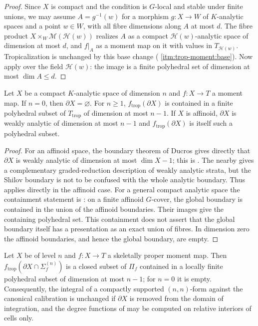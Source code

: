 \begin{proof}
Since $X$ is compact and the condition is $G$-local and stable under finite
unions, we may assume $A=g^{-1}(w)$ for a morphism $g:X\to W$ of
$K$-analytic spaces and a point $w\in W$, with all fibre dimensions along
$A$ at most $d$. The fibre product $X\times_W\mathcal M(\mathcal H(w))$
realizes $A$ as a compact $\mathcal H(w)$-analytic space of dimension at most
$d$, and $f|_A$ as a moment map on it with values in
$T_{\mathcal H(w)}$. Tropicalization is unchanged by this base change
( \cref{itm:trop-moment:base}). Now apply
 over the field
$\mathcal H(w)$: the image is a finite polyhedral set of dimension at most
$\dim A\le d$.
\end{proof}

\begin{proposition}
\label{prop:trop-boundary-thin}
Let $X$ be a compact $K$-analytic space of dimension $n$ and $f:X\to T$ a
moment map. If $n=0$, then $\partial X=\varnothing$. For $n\ge1$,
$f_{\mathrm{trop}}(\partial X)$ is contained in a finite polyhedral
subset of $T_{\mathrm{trop}}$ of dimension at most $n-1$. If $X$ is
affinoid, $\partial X$ is weakly analytic of dimension at most $n-1$ and
$f_{\mathrm{trop}}(\partial X)$ is itself such a polyhedral subset.
\end{proposition}

\begin{proof}
For an affinoid space, the boundary theorem of Ducros gives directly that
$\partial X$ is weakly analytic of dimension at most $\dim X-1$; this is
\cite[Example~11.10.2]{CLD25}. The nearby
\cite[Proposition~11.10.4]{CLD25} gives a complementary graded-reduction
description of weakly analytic strata, but the Shilov boundary is not to be
confused with the whole analytic boundary. Thus
 applies directly in the affinoid case.
For a general compact analytic space the containment statement is
\cite[Corollary~12.2.6]{CLD25}: on a finite affinoid $G$-cover, the global
boundary is contained in the union of the affinoid boundaries. Their images
give the containing polyhedral set. This containment does not assert that
the global boundary itself has a presentation as an exact union of fibres.
In dimension zero the affinoid boundaries, and hence the global boundary,
are empty.
\end{proof}

\begin{corollary}
\label{cor:trop-boundary-negligible}
Let $X$ be of level $n$ and $f:X\to T$ a skeletally proper moment map. Then
$f_{\mathrm{trop}}(\partial X\cap\Sigma_f^{(n)})$ is a closed subset of
$\Pi_f$ contained in a locally finite polyhedral subset of dimension at
most $n-1$; for $n=0$ it is empty. Consequently, the integral of
a compactly supported $(n,n)$-form against the canonical calibration is
unchanged if $\partial X$ is removed from the domain of integration, and the
degree functions of  may be computed on
relative interiors of cells only.
\end{corollary}

